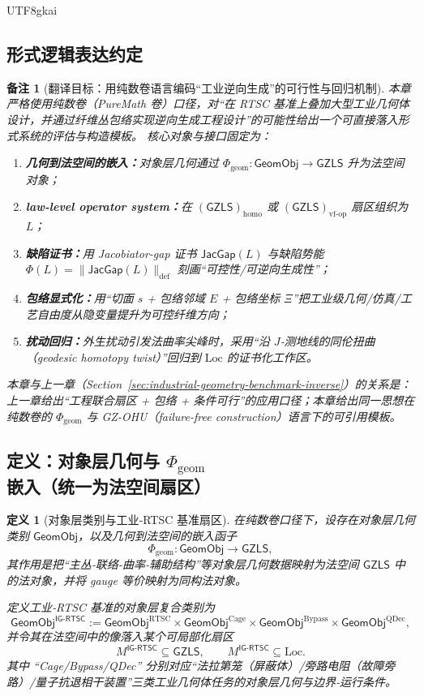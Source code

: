 \documentclass[12pt]{article}
\newtheorem{definition}{定义}[section]
\newtheorem{remark}{备注}[section]
\newcommand{\GZLS}{\ensuremath{\mathsf{GZLS}}}
\newcommand{\JacGap}{\ensuremath{\mathsf{JacGap}}}
\newcommand{\RTSC}{\textsf{RTSC}}
\begin{document}
\begin{CJK*}{UTF8}{gkai}
\subsection{形式逻辑表达约定}

\begin{remark}[翻译目标：用纯数卷语言编码“工业逆向生成”的可行性与回归机制]
本章严格使用纯数卷（PureMath 卷）口径，对“在 \RTSC{} 基准上叠加大型工业几何体设计，并通过纤维丛包络实现逆向生成工程设计”的可能性给出一个可直接落入形式系统的评估与构造模板。
核心对象与接口固定为：
\begin{enumerate}
  \item \textbf{几何到法空间的嵌入：}对象层几何通过 $\Phi_{\mathrm{geom}}:\mathsf{GeomObj}\to\GZLS$ 升为法空间对象；
  \item \textbf{law-level operator system：}在 $(\GZLS)_{\mathrm{homo}}$ 或 $(\GZLS)_{\text{vf-op}}$ 扇区组织为 $L$；
  \item \textbf{缺陷证书：}用 Jacobiator-gap 证书 $\JacGap(L)$ 与缺陷势能 $\Phi(L)=\|\JacGap(L)\|_{\mathrm{def}}$ 刻画“可控性/可逆向生成性”；
  \item \textbf{包络显式化：}用“切面 $s$ + 包络邻域 $E$ + 包络坐标 $\Xi$”把工业级几何/仿真/工艺自由度从隐变量提升为可控纤维方向；
  \item \textbf{扰动回归：}外生扰动引发法曲率尖峰时，采用“沿 $J$‑测地线的同伦扭曲（geodesic homotopy twist）”回归到 $\mathrm{Loc}$ 的证书化工作区。
\end{enumerate}
本章与上一章（Section~\ref{sec:industrial-geometry-benchmark-inverse}）的关系是：上一章给出“工程联合扇区 + 包络 + 条件可行”的应用口径；本章给出同一思想在纯数卷的
  $\Phi_{\mathrm{geom}}$ 与 \textsf{GZ-OHU}（failure-free construction）语言下的可引用模板。
\end{remark}

\subsection{定义：对象层几何与 $\Phi_{\mathrm{geom}}$ 嵌入（统一为法空间扇区）}

\begin{definition}[对象层类别与工业‑RTSC 基准扇区]
\label{def:ig-geom-sector}
在纯数卷口径下，设存在对象层几何类别 $\mathsf{GeomObj}$，以及几何到法空间的嵌入函子
\[
\Phi_{\mathrm{geom}}:\mathsf{GeomObj}\longrightarrow \GZLS,
\]
其作用是把“主丛‑联络‑曲率‑辅助结构”等对象层几何数据映射为法空间 $\GZLS$ 中的法对象，并将 gauge 等价映射为同构法对象。

定义工业‑RTSC 基准的对象层复合类别为
\[
\mathsf{GeomObj}^{\textsf{IG-RTSC}}
:=
\mathsf{GeomObj}^{\mathrm{RTSC}}
\times
\mathsf{GeomObj}^{\mathrm{Cage}}
\times
\mathsf{GeomObj}^{\mathrm{Bypass}}
\times
\mathsf{GeomObj}^{\mathrm{QDec}},
\]
并令其在法空间中的像落入某个可局部化扇区
\[
M^{\textsf{IG-RTSC}}
\subseteq
\GZLS,
\qquad
M^{\textsf{IG-RTSC}}\subseteq \mathrm{Loc}.
\]
其中 “\textsf{Cage}/\textsf{Bypass}/\textsf{QDec}” 分别对应“法拉第笼（屏蔽体）/旁路电阻（故障旁路）/量子抗退相干装置”三类工业几何体任务的对象层几何与边界‑运行条件。
\end{definition}


\end{CJK*}
\end{document}
